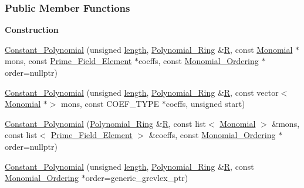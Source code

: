 \subsubsection*{Public Member Functions}
\begin{Indent}\textbf{ Construction}\par
\begin{DoxyCompactItemize}
\item 
\hyperlink{group__polygroup_a17e78adc39df3472a0610b17c906898f}{Constant\+\_\+\+Polynomial} (unsigned \hyperlink{group__polygroup_a9a6bcfaf1f4d6260b39f6abfb2b646ea}{length}, \hyperlink{group__polygroup_class_polynomial___ring}{Polynomial\+\_\+\+Ring} \&\hyperlink{group__polygroup_a551ade20b7dcd96c227dd0401f6ffbbe}{R}, const \hyperlink{group__polygroup_class_monomial}{Monomial} $\ast$mons, const \hyperlink{group___fields_group_class_prime___field___element}{Prime\+\_\+\+Field\+\_\+\+Element} $\ast$coeffs, const \hyperlink{group__orderinggroup_class_monomial___ordering}{Monomial\+\_\+\+Ordering} $\ast$order=nullptr)
\item 
\hyperlink{group__polygroup_aa64fa434a206b1b29f27b09d36060dac}{Constant\+\_\+\+Polynomial} (unsigned \hyperlink{group__polygroup_a9a6bcfaf1f4d6260b39f6abfb2b646ea}{length}, \hyperlink{group__polygroup_class_polynomial___ring}{Polynomial\+\_\+\+Ring} \&\hyperlink{group__polygroup_a551ade20b7dcd96c227dd0401f6ffbbe}{R}, const vector$<$ \hyperlink{group__polygroup_class_monomial}{Monomial} $\ast$$>$ mons, const C\+O\+E\+F\+\_\+\+T\+Y\+PE $\ast$coeffs, unsigned start)
\item 
\hyperlink{group__polygroup_ac8bd342911678053e14cf72af46819c5}{Constant\+\_\+\+Polynomial} (\hyperlink{group__polygroup_class_polynomial___ring}{Polynomial\+\_\+\+Ring} \&\hyperlink{group__polygroup_a551ade20b7dcd96c227dd0401f6ffbbe}{R}, const list$<$ \hyperlink{group__polygroup_class_monomial}{Monomial} $>$ \&mons, const list$<$ \hyperlink{group___fields_group_class_prime___field___element}{Prime\+\_\+\+Field\+\_\+\+Element} $>$ \&coeffs, const \hyperlink{group__orderinggroup_class_monomial___ordering}{Monomial\+\_\+\+Ordering} $\ast$order=nullptr)
\item 
\hyperlink{group__polygroup_abbc487b48dbf5d0dc25dfb419a341ea5}{Constant\+\_\+\+Polynomial} (unsigned \hyperlink{group__polygroup_a9a6bcfaf1f4d6260b39f6abfb2b646ea}{length}, \hyperlink{group__polygroup_class_polynomial___ring}{Polynomial\+\_\+\+Ring} \&\hyperlink{group__polygroup_a551ade20b7dcd96c227dd0401f6ffbbe}{R}, const \hyperlink{group__orderinggroup_class_monomial___ordering}{Monomial\+\_\+\+Ordering} $\ast$order=generic\+\_\+grevlex\+\_\+ptr)
$$
\end{DoxyCompactItemize}
\end{Indent}
